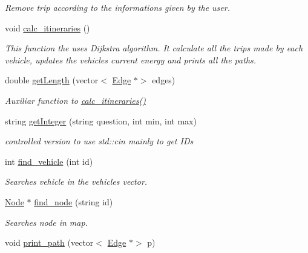 \begin{DoxyCompactItemize}
\begin{DoxyCompactList}\small\item\em Remove trip according to the informations given by the user. \end{DoxyCompactList}\item 
\mbox{\label{class_management_af5c8090bd9be9ddd8d47749a363da302}} 
void \mbox{\hyperlink{class_management_af5c8090bd9be9ddd8d47749a363da302}{calc\+\_\+itineraries}} ()
\begin{DoxyCompactList}\small\item\em This function the uses Dijkstra algorithm. It calculate all the trips made by each vehicle, updates the vehicle\textquotesingle{}s current energy and prints all the paths. \end{DoxyCompactList}\item 
double \mbox{\hyperlink{class_management_a396e4d7bd472ce1678c278e0b4df1cfe}{get\+Length}} (vector$<$ \mbox{\hyperlink{class_edge}{Edge}} $\ast$$>$ edges)
\begin{DoxyCompactList}\small\item\em Auxiliar function to \mbox{\hyperlink{class_management_af5c8090bd9be9ddd8d47749a363da302}{calc\+\_\+itineraries()}} \end{DoxyCompactList}\item 
string \mbox{\hyperlink{class_management_a00f02fdc0b2e15d98d3350a23e58efee}{get\+Integer}} (string question, int min, int max)
\begin{DoxyCompactList}\small\item\em controlled version to use std\+::cin mainly to get ID\textquotesingle{}s \end{DoxyCompactList}\item 
int \mbox{\hyperlink{class_management_a79bd0ad615c9d128e5d81c07a033c4d8}{find\+\_\+vehicle}} (int id)
\begin{DoxyCompactList}\small\item\em Searches vehicle in the vehicles vector. \end{DoxyCompactList}\item 
\mbox{\hyperlink{class_node}{Node}} $\ast$ \mbox{\hyperlink{class_management_a901f0f1aba1db0da4e015c60abec104d}{find\+\_\+node}} (string id)
\begin{DoxyCompactList}\small\item\em Searches node in map. \end{DoxyCompactList}\item 
void \mbox{\hyperlink{class_management_a24d2b454c34f53a3dbcddde32cd21a9c}{print\+\_\+path}} (vector$<$ \mbox{\hyperlink{class_edge}{Edge}} $\ast$$>$ p)

\end{DoxyCompactItemize}
